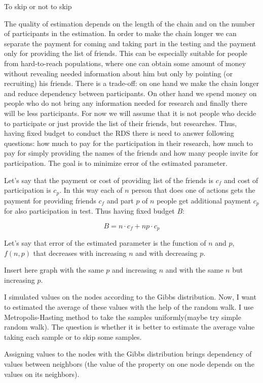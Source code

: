 \documentclass[12pt]{report}
\begin{document}
To skip or not to skip



The quality of estimation depends on the length of the chain and on the number of participants in the estimation.
In order to make the chain longer we can separate the payment for coming and taking part in the testing and the payment only for providing the list of friends.
This can be especially suitable for people from hard-to-reach populations, where one can obtain some amount of money without revealing needed information about him but only by pointing (or recruiting) his friends. There is a trade-off: on one hand we make the chain longer and reduce dependency between participants. On other hand we spend money on people who do not bring any information needed for research and finally there will be less participants. 
For now we will assume that it is not people who decide to participate or just provide the list of their friends, but researches. Thus, having fixed budget to conduct the RDS there is need to answer following questions: how much to pay for the participation in their research, how much to pay for simply providing the names of the friends and how many people invite for participation. The goal is to minimize error of the estimated parameter.

Let's say that the payment or cost of providing list of the friends is $c_f$ and cost of participation is $c_p$. In this way each of $n$ person that does one of actions gets the payment for providing friends $c_f$ and part $p$ of $n$ people get additional payment $c_p$ for also participation in test.
Thus having fixed budget $B$:

$$B = n \cdot c_f + np \cdot c_p$$

Let's say that error of the estimated parameter is the function of $n$ and $p$, $f(n,p)$ that decreases with increasing $n$ and with decreasing $p$.

Insert here graph with the same $p$ and increasing $n$ and with the same $n$ but increasing $p$.

I simulated values on the nodes  according to the Gibbs distribution. Now, I want to estimated the average of these values with the help of the random walk. I use Metropolis-Hasting method to take the samples uniformly(maybe try simple random walk). The question is whether it is better to estimate the average value taking each sample or to skip some samples. 

Assigning values to the nodes with the Gibbs distribution brings dependency of values between neighbors (the value of the property on one node depends on the values on its neighbors).
\end{document}
